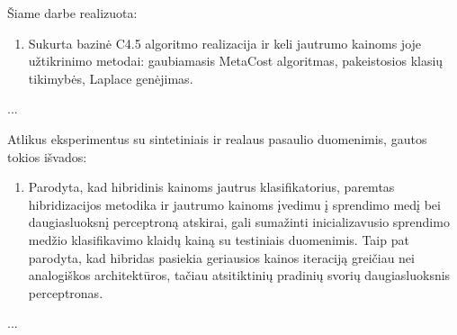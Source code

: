 
Šiame darbe realizuota:
\begin{enumerate}
\item Sukurta bazinė C4.5 algoritmo realizacija ir keli jautrumo kainoms joje užtikrinimo metodai: gaubiamasis MetaCost algoritmas, pakeistosios klasių tikimybės, Laplace genėjimas. 
\end{enumerate}

...

Atlikus eksperimentus su sintetiniais ir realaus pasaulio duomenimis, gautos tokios išvados:
\begin{enumerate}
\item Parodyta, kad hibridinis kainoms jautrus klasifikatorius, paremtas \cite{Banerjee:1997:INN:267553.267554} hibridizacijos metodika ir jautrumo kainoms įvedimu į sprendimo medį bei daugiasluoksnį perceptroną atskirai, gali sumažinti inicializavusio sprendimo medžio klasifikavimo klaidų kainą su testiniais duomenimis. Taip pat parodyta, kad hibridas pasiekia geriausios kainos iteraciją greičiau nei analogiškos architektūros, tačiau atsitiktinių pradinių svorių daugiasluoksnis perceptronas.
\end{enumerate}

...
